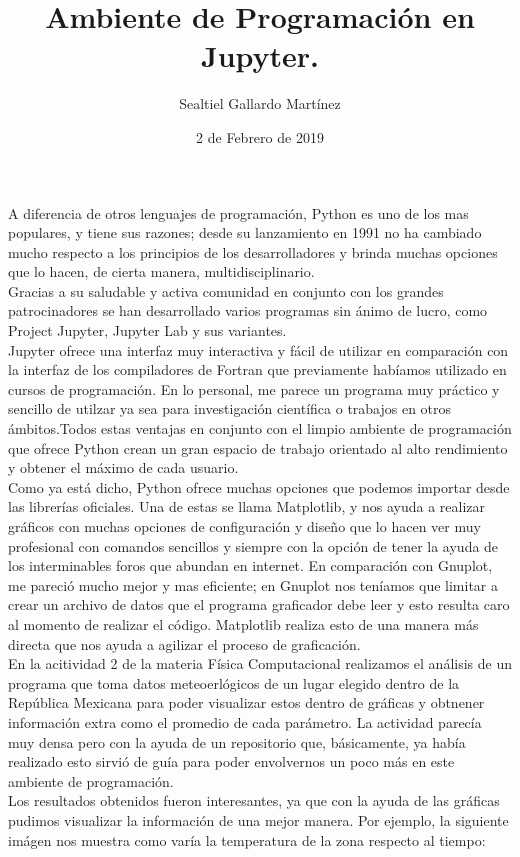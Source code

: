 \documentclass[12pt, spanish, letterpaper]{article}
\title{Ambiente de Programación en Jupyter.}
\author{Sealtiel Gallardo Martínez}
\date{2 de Febrero de 2019}
\begin{document}
\maketitle

A diferencia de otros lenguajes de programación, Python es uno de los mas populares, y tiene sus razones; desde su lanzamiento en 1991 no ha cambiado mucho respecto a los principios de los desarrolladores y brinda muchas opciones que lo hacen, de cierta manera, multidisciplinario. 
\\
Gracias a su saludable y activa comunidad en conjunto con los grandes patrocinadores se han desarrollado varios programas sin ánimo de lucro, como Project Jupyter, Jupyter Lab y sus variantes.
\\
Jupyter ofrece una interfaz muy interactiva y fácil de utilizar en comparación con la interfaz de los compiladores de Fortran que previamente habíamos utilizado en cursos de programación. En lo personal, me parece un programa muy práctico y sencillo de utilzar ya sea para investigación científica o trabajos en otros ámbitos.Todos estas ventajas en conjunto con el limpio ambiente de programación que ofrece Python crean un gran espacio de trabajo orientado al alto rendimiento y obtener el máximo de cada usuario.
\\
Como ya está dicho, Python ofrece muchas opciones que podemos importar desde las librerías oficiales. Una de estas se llama Matplotlib, y nos ayuda a realizar gráficos con muchas opciones de configuración y diseño que lo hacen ver muy profesional con comandos sencillos y siempre con la opción de tener la ayuda de los interminables foros que abundan en internet. En comparación con Gnuplot, me pareció mucho mejor y mas eficiente; en Gnuplot nos teníamos que limitar a crear un archivo de datos que el programa graficador debe leer y esto resulta caro al momento de realizar el código. Matplotlib realiza esto de una manera más directa que nos ayuda a agilizar el proceso de graficación.
\\

En la acitividad 2 de la materia Física Computacional realizamos el análisis de un programa que toma datos meteoerlógicos de un lugar elegido dentro de la República Mexicana para poder visualizar estos dentro de gráficas y obtnener información extra como el promedio de cada parámetro. La actividad parecía muy densa pero con la ayuda de un repositorio que, básicamente, ya había realizado esto sirvió de guía para poder envolvernos un poco más en este ambiente de programación.
\\
Los resultados obtenidos fueron interesantes, ya que con la ayuda de las gráficas pudimos visualizar la información de una mejor manera. Por ejemplo, la siguiente imágen nos muestra como varía la temperatura de la zona respecto al tiempo:
\end{document}
